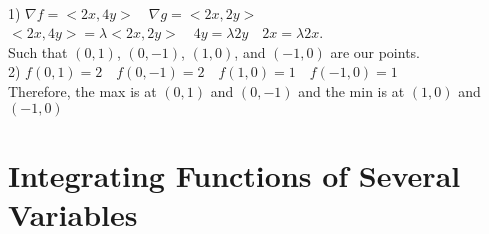 \documentclass{article}
\begin{document}
\sol \\
1) $\nabla f = <2x,4y> \quad \nabla g = <2x,2y>$ \\
$ <2x,4y> = \lambda <2x, 2y> \quad 4y = \lambda 2y \quad 2x = \lambda 2x$. \\
Such that $(0,1)$, $(0,-1)$, $(1,0)$, and $(-1,0)$ are our points. \\
2) $f(0,1) = 2 \quad f(0,-1) = 2 \quad f(1,0) = 1 \quad f(-1,0) = 1$ \\
Therefore, the max is at $(0,1)$ and $(0,-1)$ and the min is at $(1,0)$ and $(-1,0)$
\newpage
\section{Integrating Functions of Several Variables}
\end{document}
